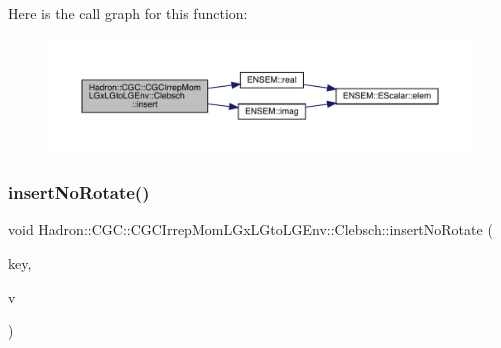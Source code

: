 Here is the call graph for this function\+:
\nopagebreak
\begin{figure}[H]
\begin{center}
\leavevmode
\includegraphics[width=350pt]{d1/d39/classHadron_1_1CGC_1_1CGCIrrepMomLGxLGtoLGEnv_1_1Clebsch_a4d4ec2ede98509ab49ac04fe23ef2ea8_cgraph}
\end{center}
\end{figure}
\mbox{\label{classHadron_1_1CGC_1_1CGCIrrepMomLGxLGtoLGEnv_1_1Clebsch_a57c67efaf6fb826157a5c19a4066959e}} 
\subsubsection{\texorpdfstring{insertNoRotate()}{insertNoRotate()}\hspace{0.1cm}{\footnotesize\ttfamily [1/2]}}
{\footnotesize\ttfamily void Hadron\+::\+C\+G\+C\+::\+C\+G\+C\+Irrep\+Mom\+L\+Gx\+L\+Gto\+L\+G\+Env\+::\+Clebsch\+::insert\+No\+Rotate (\begin{DoxyParamCaption}\item[{const \mbox{\hyperlink{structHadron_1_1CGCKeyType}{C\+G\+C\+Key\+Type}}$<$ \mbox{\hyperlink{structHadron_1_1KeyCGCIrrepMom__t}{Key\+C\+G\+C\+Irrep\+Mom\+\_\+t}} $>$ \&}]{key,  }\item[{\mbox{\hyperlink{namespaceHadron_1_1CGC_a52d2b70e6792726fb525eab94daae53b}{cdouble}}}]{v }\end{DoxyParamCaption})\hspace{0.3cm}{\ttfamily [inline]}}

